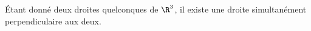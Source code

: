Étant donné deux droites quelconques de $\R^3$, il existe une droite simultanément perpendiculaire aux deux.

\begin{reponses}
\end{reponses}

